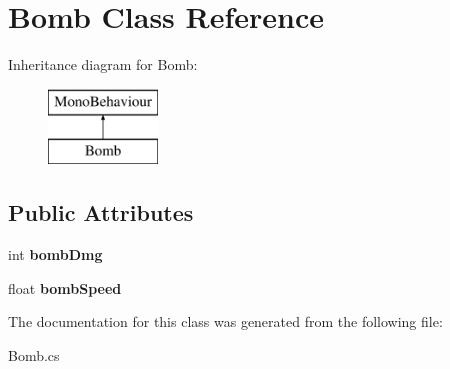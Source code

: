 \hypertarget{class_bomb}{}\section{Bomb Class Reference}
\label{class_bomb}
Inheritance diagram for Bomb\+:\begin{figure}[H]
\begin{center}
\leavevmode
\includegraphics[height=2.000000cm]{class_bomb}
\end{center}
\end{figure}
\subsection*{Public Attributes}
\begin{DoxyCompactItemize}
\item 
\mbox{\label{class_bomb_ac00ec933c991f5e1d89cb0409795ec95}} 
int {\bfseries bomb\+Dmg}
\item 
\mbox{\label{class_bomb_a8b4b5c89e9e4de537c5f40478bf93fbb}} 
float {\bfseries bomb\+Speed}
\end{DoxyCompactItemize}


The documentation for this class was generated from the following file\+:\begin{DoxyCompactItemize}
\item 
Bomb.\+cs\end{DoxyCompactItemize}
